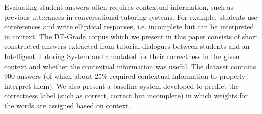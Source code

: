 Evaluating student answers often requires contextual information, such as previous utterances in conversational tutoring systems. For example, students use coreferences and write elliptical responses, i.e. incomplete but can be interpreted in context. The DT-Grade corpus which we present in this paper consists of short constructed answers extracted from tutorial dialogues between students and an Intelligent Tutoring System and annotated for their correctness in the given context and whether the contextual information was useful. The dataset contains 900 answers (of which about 25\% required contextual information to properly interpret them). We also present a baseline system developed to predict the correctness label (such as correct, correct but incomplete) in which weights for the words are assigned based on context.
